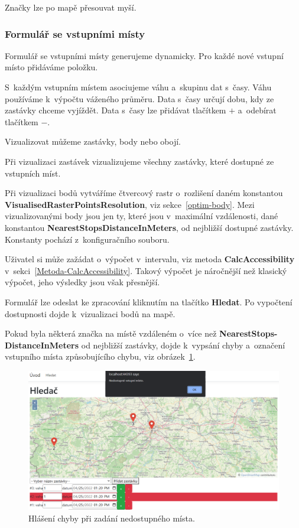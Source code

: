 Značky lze po mapě přesouvat myší.

\subsubsection{Formulář se vstupními místy}

Formulář se vstupními místy generujeme dynamicky. Pro každé nové vstupní místo přidáváme položku.

S~každým vstupním místem asociujeme váhu a~skupinu dat s~časy. Váhu používáme k~výpočtu váženého průměru. Data s~časy určují dobu, kdy ze zastávky chceme vyjíždět. Data s~časy lze přidávat tlačítkem $+$ a~odebírat tlačítkem $-$.

Vizualizovat můžeme zastávky, body nebo obojí.

Při vizualizaci zastávek vizualizujeme všechny zastávky, které dostupné ze vstupních míst.

Při vizualizaci bodů vytváříme čtvercový rastr o~rozlišení daném konstantou \textbf{VisualisedRasterPointsResolution}, viz sekce~\ref{optim-body}. Mezi vizualizovanými body jsou jen ty, které jsou v~maximální vzdálenosti, dané konstantou \textbf{NearestStopsDistanceInMeters}, od nejbližší dostupné zastávky. Konstanty pochází z~konfiguračního souboru.

Uživatel si může zažádat o~výpočet v~intervalu, viz metoda \textbf{CalcAccessibility} v~sekci~\ref{Metoda-CalcAccessibility}. Takový výpočet je náročnější než klasický výpočet, jeho výsledky jsou však přesnější.

Formulář lze odeslat ke zpracování kliknutím na tlačítko \textbf{Hledat}. Po vypočtení dostupnosti dojde k~vizualizaci bodů na mapě.

Pokud byla některá značka na místě vzdáleném o~více než \textbf{NearestStops\hyp{}DistanceInMeters} od nejbližší zastávky, dojde k~vypsání chyby a~označení vstupního místa způsobujícího chybu, viz obrázek~\ref{fig:Finder-chyba}.

\begin{figure}[ht]
    \centering
    \includegraphics[width=\textwidth]{../img/finder-chyba.png}
    \caption{Hlášení chyby při zadání nedostupného místa.}
    \label{fig:Finder-chyba}
\end{figure}

